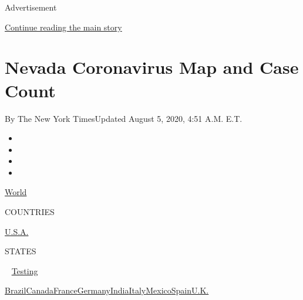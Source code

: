 Advertisement

\protect\hyperlink{after-top}{Continue reading the main story}

\hypertarget{nevada-coronavirus-map-and-case-count}{%
\section{Nevada Coronavirus Map and Case
Count}\label{nevada-coronavirus-map-and-case-count}}

By The New York TimesUpdated August 5, 2020, 4:51 A.M. E.T.

\begin{itemize}
\item
\item
\item
\item
\end{itemize}

\href{https://www.nytimes.com/interactive/2020/world/coronavirus-maps.html}{World}~

COUNTRIES

\textbar{}
\href{https://www.nytimes.com/interactive/2020/us/coronavirus-us-cases.html}{U.S.A.}~

STATES

~
\href{https://www.nytimes.com/interactive/2020/us/coronavirus-testing.html}{Testing}

\href{https://www.nytimes.com/interactive/2020/world/americas/brazil-coronavirus-cases.html}{Brazil}\href{https://www.nytimes.com/interactive/2020/world/canada/canada-coronavirus-cases.html}{Canada}\href{https://www.nytimes.com/interactive/2020/world/europe/france-coronavirus-cases.html}{France}\href{https://www.nytimes.com/interactive/2020/world/europe/germany-coronavirus-cases.html}{Germany}\href{https://www.nytimes.com/interactive/2020/world/asia/india-coronavirus-cases.html}{India}\href{https://www.nytimes.com/interactive/2020/world/europe/italy-coronavirus-cases.html}{Italy}\href{https://www.nytimes.com/interactive/2020/world/americas/mexico-coronavirus-cases.html}{Mexico}\href{https://www.nytimes.com/interactive/2020/world/europe/spain-coronavirus-cases.html}{Spain}\href{https://www.nytimes.com/interactive/2020/world/europe/united-kingdom-coronavirus-cases.html}{U.K.}

